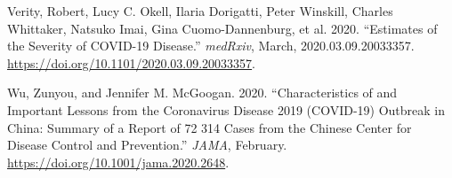\documentclass[
]{article}
\begin{document}
\leavevmode\hypertarget{ref-verity2020}{}%
Verity, Robert, Lucy C. Okell, Ilaria Dorigatti, Peter Winskill, Charles
Whittaker, Natsuko Imai, Gina Cuomo-Dannenburg, et al. 2020. ``Estimates
of the Severity of COVID-19 Disease.'' \emph{medRxiv}, March,
2020.03.09.20033357. \url{https://doi.org/10.1101/2020.03.09.20033357}.

\leavevmode\hypertarget{ref-wu2020}{}%
Wu, Zunyou, and Jennifer M. McGoogan. 2020. ``Characteristics of and
Important Lessons from the Coronavirus Disease 2019 (COVID-19) Outbreak
in China: Summary of a Report of 72 314 Cases from the Chinese Center
for Disease Control and Prevention.'' \emph{JAMA}, February.
\url{https://doi.org/10.1001/jama.2020.2648}.
\end{document}
